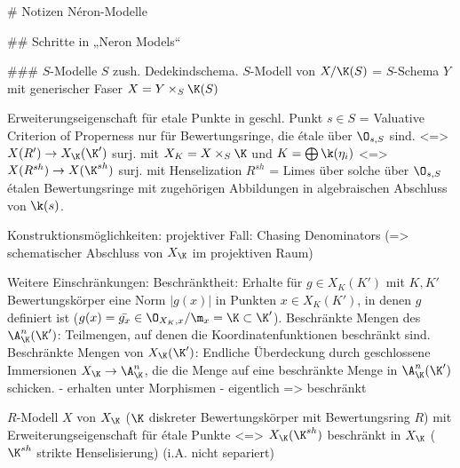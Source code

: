 # Notizen Néron-Modelle

## Schritte in „Neron Models“

### $S$-Modelle 
$S$ zush. Dedekindschema.
$S$-Modell von $X/\K(S)$ = $S$-Schema $Y$ mit generischer Faser $X=Y \times_S \K(S)$

Erweiterungseigenschaft für etale Punkte in geschl. Punkt $s\in S$
= Valuative Criterion of Properness nur für Bewertungsringe, die étale
über $\O_{s,S}$ sind.
<=> $X(R') \to X_\K(\K')$ surj.
    mit $X_K=X \times_S \K$ und $K=\bigoplus \k(\eta_i)$
<=> $X(R^{sh}) \to X(\K^{sh})$ surj.
    mit Henselization $R^{sh}$ = Limes über solche über $\O_{s,S}$ étalen
    Bewertungsringe mit zugehörigen Abbildungen in algebraischen Abschluss
    von $\k(s)$.

Konstruktionsmöglichkeiten:
projektiver Fall: Chasing Denominators (=> schematischer Abschluss von
$X_\K$ im projektiven Raum)

Weitere Einschränkungen:
Beschränktheit: Erhalte für $g\in X_K(K')$ mit $K,K'$ Bewertungskörper
eine Norm $|g(x)|$ in Punkten $x\in X_K(K')$, in denen $g$ definiert
ist ($g(x)=\bar{g_x}\in \O_{X_K,x}/\m_x=\K\subset\K' $).
Beschränkte Mengen des $\A_\K^n(\K')$: Teilmengen, auf denen die
Koordinatenfunktionen beschränkt sind.
Beschränkte Mengen von $X_\K(\K')$: Endliche Überdeckung durch
geschlossene Immersionen $X_\K\to\A_\K^n$, die die Menge auf eine
beschränkte Menge in $\A_\K^n(\K')$ schicken.
- erhalten unter Morphismen
- eigentlich => beschränkt

$R$-Modell $X$ von $X_\K$ ($\K$ diskreter Bewertungskörper mit
Bewertungsring $R$) mit Erweiterungseigenschaft für étale Punkte
<=> $X_\K(\K^{sh})$ beschränkt in $X_\K$ ($\K^{sh}$ strikte
Henselisierung)
(i.A. nicht separiert)